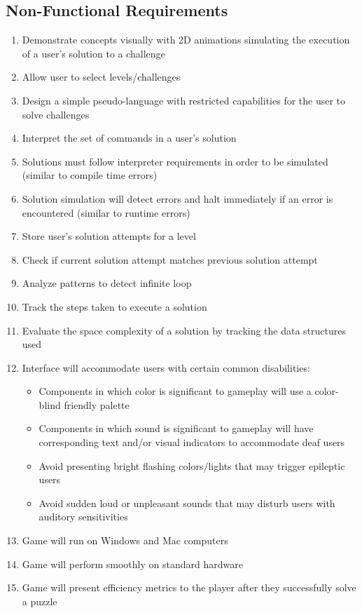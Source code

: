 \subsection{Non-Functional Requirements}
\begin{enumerate}
	\item Demonstrate concepts visually with 2D animations simulating the 
		execution of a user’s solution to a challenge
	\item Allow user to select levels/challenges
	\item Design a simple pseudo-language with restricted capabilities for the
		user to solve challenges
	\item Interpret the set of commands in a user’s solution
	\item Solutions must follow interpreter requirements in order to be simulated
		(similar to compile time errors)
	\item Solution simulation will detect errors and halt immediately if an error
		is encountered (similar to runtime errors)
	\item Store user’s solution attempts for a level
	\item Check if current solution attempt matches previous solution attempt
	\item Analyze patterns to detect infinite loop
	\item Track the steps taken to execute a solution
	\item Evaluate the space complexity of a solution by tracking the data
		structures used
\newpage
	\item Interface will accommodate users with certain common disabilities:
		\begin{itemize}
		\item Components in which color is significant to gameplay will use 
			a color-blind friendly palette
		\item Components in which sound is significant to gameplay will have
			corresponding text and/or visual indicators to accommodate deaf users
		\item Avoid presenting bright flashing colors/lights that may trigger
			epileptic users
		\item Avoid sudden loud or unpleasant sounds that may disturb users with
			auditory sensitivities
		\end{itemize}
	\item Game will run on Windows and Mac computers
	\item Game will perform smoothly on standard hardware
	\item Game will present efficiency metrics to the player after they successfully 
		solve a puzzle
\end{enumerate}